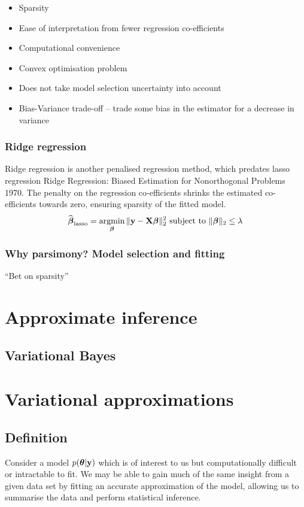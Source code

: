 \documentclass{amsart}[12pt]
\begin{document}
\begin{itemize}
\item Sparsity
\item Ease of interpretation from fewer regression co-efficients
\item Computational convenience
\item Convex optimisation problem
\item Does not take model selection uncertainty into account
\item Bias-Variance trade-off -- trade some bias in the estimator for a decrease in variance
\end{itemize}

\subsubsection{Ridge regression}
Ridge regression is another penalised regression method, which predates lasso regression Ridge Regression: Biased Estimation for Nonorthogonal Problems 1970. The penalty on the regression co-efficients shrinks the estimated co-efficients towards
zero, ensuring sparsity of the fitted model.
$$
\widehat{\vbeta}_{\text{lasso}} = \argmin_\vbeta \|\vy - \mX \vbeta\|_2^2 \text{ subject to } \|\vbeta\|_2 \leq \lambda
$$
\subsubsection{Why parsimony? Model selection and fitting}
``Bet on sparsity''
\citep{Hastie2015}

\section{Approximate inference}
\subsection{Variational Bayes}
\section{Variational approximations}

\subsection{Definition}

Consider a model $p({\boldsymbol \theta}|{\bf y})$ which is of interest to us but computationally difficult or intractable to 
fit. We may be able to gain much of the same insight from a given data set by fitting an accurate approximation 
of the model, allowing us to summarise the data and perform statistical inference.
\end{document}
